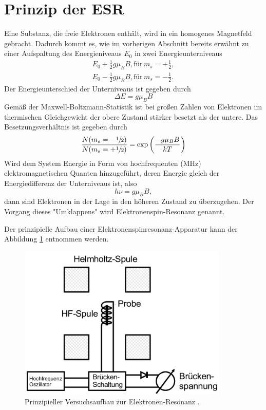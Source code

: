 \section{Prinzip der ESR}
Eine Substanz, die freie Elektronen enthält, wird in ein homogenes Magnetfeld gebracht.
Dadurch kommt es, wie im vorherigen Abschnitt bereits erwähnt zu einer Aufspaltung des Energieniveaus $E_0$ in zwei Energieunterniveaus
\begin{gather*}
  E_0 + \frac{1}{2}g\mu_{B}B, \text{für}\, m_s= +\frac{1}{2},\\
  E_0 - \frac{1}{2}g\mu_{B}B, \text{für}\, m_s= -\frac{1}{2}.
\end{gather*}
Der Energieunterschied der Unterniveaus ist gegeben durch
\begin{equation}
  \Delta E = g\mu_{B}B
\end{equation}
Gemäß der Maxwell-Boltzmann-Statistik ist bei großen Zahlen von Elektronen im thermischen Gleichgewicht der obere Zustand stärker besetzt als der untere.
Das Besetzungsverhältnis ist gegeben durch
\begin{equation*}
  \frac{N(m_s = -\sfrac{1}{2})}{N(m_s = +\sfrac{1}{2})} = \exp\left( \frac{-g\mu_{B}B}{kT} \right)
\end{equation*}
Wird dem System Energie in Form von hochfrequenten (MHz) elektromagnetischen Quanten hinzugeführt, deren Energie gleich der Energiedifferenz der Unterniveaus ist, also
\begin{equation}
  h\nu = g\mu_{B}B,
  \label{eqn:hv}
\end{equation}
dann sind Elektronen in der Lage in den höheren Zustand zu überzugehen.
Der Vorgang dieses "Umklappens" wird Elektronenspin-Resonanz genannt.

Der prinzipielle Aufbau einer Elektronenspinresonanz-Apparatur kann der Abbildung \ref{fig:ESR} entnommen werden.

\begin{figure}[H]
  \centering
  \includegraphics[width=10cm]{ESR.png}
  \caption{Prinzipieller Versuchsaufbau zur Elektronen-Resonanz \cite{skript}.}
  \label{fig:ESR}
\end{figure}


